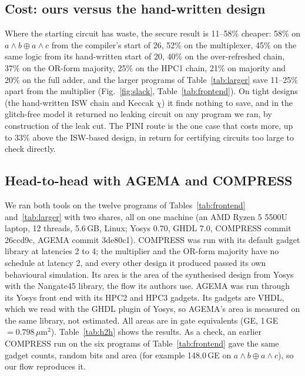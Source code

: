 \documentclass[conference]{IEEEtran}
\begin{document}
\subsection{Cost: ours versus the hand-written design}
Where the starting circuit has waste, the secure result is 11--58\% cheaper: 58\% on $a\wedge b\oplus a\wedge c$ from the compiler's start of 26, 52\% on the multiplexer, 45\% on the same logic from its hand-written start of 20, 40\% on the over-refreshed chain, 37\% on the OR-form majority, 25\% on the HPC1 chain, 21\% on majority and 20\% on the full adder, and the larger programs of Table~\ref{tab:larger} save 11--25\% apart from the multiplier (Fig.~\ref{fig:slack}, Table~\ref{tab:frontend}). On tight designs (the hand-written ISW chain and Keccak $\chi$) it finds nothing to save, and in the glitch-free model it returned no leaking circuit on any program we ran, by construction of the leak cut. The PINI route is the one case that costs more, up to 33\% above the ISW-based design, in return for certifying circuits too large to check directly.

\subsection{Head-to-head with AGEMA and COMPRESS}\label{sec:h2h}
We ran both tools on the twelve programs of Tables~\ref{tab:frontend} and~\ref{tab:larger} with two shares, all on one machine (an AMD Ryzen 5 5500U laptop, 12 threads, 5.6\,GB, Linux; Yosys 0.70, GHDL 7.0, COMPRESS commit 26ccd9c, AGEMA commit 3de80c1). COMPRESS was run with its default gadget library at latencies 2 to 4; the multiplier and the OR-form majority have no schedule at latency 2, and every other design it produced passed its own behavioural simulation. Its area is the area of the synthesised design from Yosys with the Nangate45 library, the flow its authors use. AGEMA was run through its Yosys front end with its HPC2 and HPC3 gadgets. Its gadgets are VHDL, which we read with the GHDL plugin of Yosys, so AGEMA's area is measured on the same library, not estimated. All areas are in gate equivalents (GE, 1\,GE $=0.798\,\mu$m$^2$). Table~\ref{tab:h2h} shows the results. As a check, an earlier COMPRESS run on the six programs of Table~\ref{tab:frontend} gave the same gadget counts, random bits and area (for example 148.0\,GE on $a\wedge b\oplus a\wedge c$), so our flow reproduces it.
\end{document}
